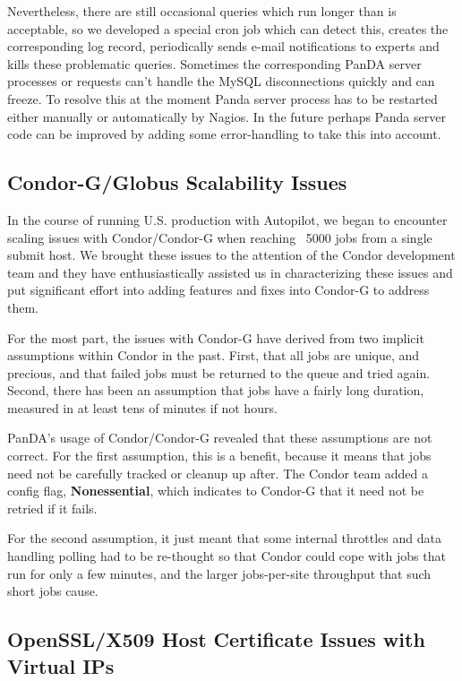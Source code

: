 \documentclass[letterpaper]{jpconf}
\begin{document}
Nevertheless, there are still occasional queries which run longer than is
acceptable, so we developed a special cron job which can detect this, creates
the corresponding log record, periodically sends e-mail notifications to experts and 
kills these problematic queries. Sometimes the corresponding PanDA server
processes or requests can't handle the MySQL disconnections quickly and can
freeze. To resolve this at the moment Panda server process has to be restarted
either manually or automatically by Nagios. In the future perhaps Panda
server code can be improved by adding some error-handling to take this into
account.

\subsection{Condor-G/Globus Scalability Issues}

In the course of running U.S. production with Autopilot, we began to encounter
scaling issues with Condor/Condor-G when reaching ~5000 jobs from a single
submit host. We brought these issues to the attention of the Condor
development team and they have enthusiastically assisted us in characterizing
these issues and put significant effort into adding features and fixes into
Condor-G to address them. 

For the most part, the issues with Condor-G have derived from two implicit
assumptions within Condor in the past. First, that all jobs are unique, and
precious, and that failed jobs must be returned to the queue and tried again.
Second, there has been an assumption that jobs have a fairly long duration,
measured in at least tens of minutes if not hours. 

PanDA's usage of Condor/Condor-G revealed that these assumptions are not
correct. For the first assumption, this is a benefit, because it means that jobs
need not be carefully tracked or cleanup up after. The Condor team added a config
flag, {\bf Nonessential}, which indicates to Condor-G that it need not be
retried if it fails. 

For the second assumption, it just meant that some internal throttles and data
handling polling had to be re-thought so that Condor could cope with jobs that
run for only a few minutes, and the larger jobs-per-site throughput that such
short jobs cause. 

\subsection{OpenSSL/X509 Host Certificate Issues with Virtual IPs}
\end{document}
